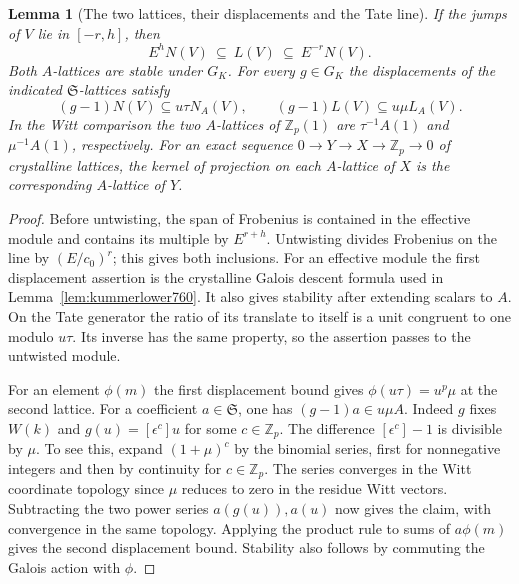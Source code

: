 \documentclass[a4paper,11pt]{article}
\newtheorem{lemma}[proposition]{Lemma}
\theoremstyle{definition}
\theoremstyle{remark}
\newcommand{\ZZ}{\mathbb Z}\newcommand{\ord}{\operatorname{ord}}
\numberwithin{equation}{section}
\begin{document}
\begin{lemma}[The two lattices, their displacements and the Tate line]
\leavevmode\label{lem:adjacentlattice762}
If the jumps of \(V\) lie in \([-r,h]\), then
\[
      E^h N(V)\ \subseteq\ L(V)\ \subseteq\ E^{-r}N(V).
\]
Both \(A\)-lattices are stable under \(G_K\). For every
\(g\in G_K\) the displacements of the indicated
\(\mathfrak S\)-lattices satisfy
\[
   (g-1)N(V)\subseteq u\tau N_A(V),\qquad
   (g-1)L(V)\subseteq u\mu L_A(V).
\]
In the Witt comparison the two \(A\)-lattices of \(\ZZ_p(1)\)
are \(\tau^{-1}A(1)\) and \(\mu^{-1}A(1)\), respectively.
For an exact sequence \(0\to Y\to X\to\ZZ_p\to0\) of
crystalline lattices, the kernel of projection on each
\(A\)-lattice of \(X\) is the corresponding \(A\)-lattice of \(Y\).
\end{lemma}
\begin{proof}
Before untwisting, the span of Frobenius is contained in the
effective module and contains its multiple by \(E^{r+h}\).
Untwisting divides Frobenius on the line by \((E/c_0)^r\);
this gives both inclusions. For an effective module the first
displacement assertion is the crystalline Galois descent
formula used in Lemma~\ref{lem:kummerlower760}. It also gives
stability after extending scalars to \(A\). On the Tate
generator the ratio of its translate to itself is a unit
congruent to one modulo \(u\tau\). Its inverse has the
same property, so the assertion passes to the untwisted
module.~\cite[Appendix~F, (F.10) and Theorem~F.11]{III-II-geeliudesc760}

For an element \(\phi(m)\) the first displacement bound gives
\(\phi(u\tau)=u^p\mu\) at the second lattice. For a coefficient
\(a\in\mathfrak S\), one has \((g-1)a\in u\mu A\). Indeed \(g\)
fixes \(W(k)\) and \(g(u)=[\epsilon^{c}]u\) for some \(c\in\ZZ_p\).
The difference \([\epsilon^{c}]-1\) is divisible by \(\mu\).
To see this, expand \((1+\mu)^c\) by the binomial series,
first for nonnegative integers and then by continuity for
\(c\in\ZZ_p\). The series converges in the Witt coordinate
topology since \(\mu\) reduces to zero in the residue Witt
vectors. Subtracting the two power series \(a(g(u)),a(u)\)
now gives the claim, with convergence in the same topology.
Applying the product rule to sums of \(a\phi(m)\) gives the
second displacement bound. Stability also follows by commuting
the Galois action with \(\phi\).


\end{proof}
\end{document}
